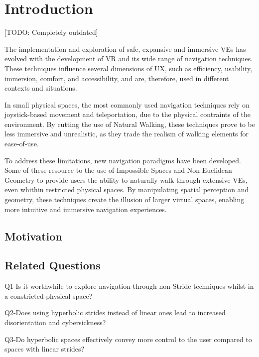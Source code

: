 
%

\chapter{Introduction}     
\label{cha:introduction}


\epigraphfontsize{\small\itshape}
\setlength\epigraphwidth{12.5cm}
\setlength\epigraphrule{0pt}

[TODO: Completely outdated]

The implementation and exploration of safe, expansive and immersive \glspl{VE} has evolved with the development of \gls{VR} and its wide range of navigation techniques. 
These techniques influence several dimensions of \gls{UX}, such as efficiency, usability, immersion, comfort, and accessibility, and are, therefore, used in different contexts and situations.

In small physical spaces, the most commonly used navigation techniques rely on joystick-based movement and teleportation, due to the physical contraints of the environment. 
By cutting the use of Natural Walking, these techniques prove to be less immersive and unrealistic, as they trade the realism of walking elements for ease-of-use.

To address these limitations, new navigation paradigms have been developed. Some of these resource to the use of Impossible Spaces and 
Non-Euclidean Geometry to provide users the ability to naturally walk through extensive \glspl{VE}, even whithin restricted physical spaces. 
By manipulating spatial perception and geometry, these techniques create the illusion of larger virtual spaces, enabling more intuitive and immersive navigation experiences.


\section{Motivation}

\section{Related Questions}

Q1-Is it worthwhile to explore navigation through non-Stride techniques whilst in a constricted physical space?

Q2-Does using hyperbolic strides instead of linear ones lead to increased disorientation and cybersickness?

Q3-Do hyperbolic spaces effectively convey more control to the user compared to spaces with linear strides?


\newcommand{\Overleaf}{\href{https://www.overleaf.com?r=f5160636&rm=d&rs=b}{Overleaf}}